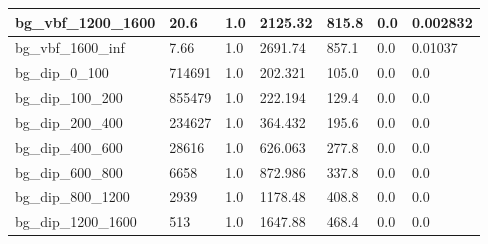 \documentclass[a4paper, 10pt]{article}
\begin{document}
\begin{table}[H]
\begin{center}
\begin{tabular}{|m{23.0mm}|m{23.0mm}|m{18.0mm}|m{19.0mm}|m{19.0mm}|m{19.0mm}|m{19.0mm}|}
      \hline
      {\cellcolor{white}         bg\_vbf\_1200\_1600}& {\cellcolor{white}         20.6}& {\cellcolor{white}         1.0}& {\cellcolor{white}         2125.32}& {\cellcolor{white}         815.8}& {\cellcolor{green}         0.0}& {\cellcolor{green}         0.002832}\\
      \hline
      {\cellcolor{white}         bg\_vbf\_1600\_inf}& {\cellcolor{white}         7.66}& {\cellcolor{white}         1.0}& {\cellcolor{white}         2691.74}& {\cellcolor{white}         857.1}& {\cellcolor{green}         0.0}& {\cellcolor{green}         0.01037}\\
      \hline
      {\cellcolor{white}         bg\_dip\_0\_100}& {\cellcolor{white}         714691}& {\cellcolor{white}         1.0}& {\cellcolor{white}         202.321}& {\cellcolor{white}         105.0}& {\cellcolor{green}         0.0}& {\cellcolor{green}         0.0}\\
      \hline
      {\cellcolor{white}         bg\_dip\_100\_200}& {\cellcolor{white}         855479}& {\cellcolor{white}         1.0}& {\cellcolor{white}         222.194}& {\cellcolor{white}         129.4}& {\cellcolor{green}         0.0}& {\cellcolor{green}         0.0}\\
      \hline
      {\cellcolor{white}         bg\_dip\_200\_400}& {\cellcolor{white}         234627}& {\cellcolor{white}         1.0}& {\cellcolor{white}         364.432}& {\cellcolor{white}         195.6}& {\cellcolor{green}         0.0}& {\cellcolor{green}         0.0}\\
      \hline
      {\cellcolor{white}         bg\_dip\_400\_600}& {\cellcolor{white}         28616}& {\cellcolor{white}         1.0}& {\cellcolor{white}         626.063}& {\cellcolor{white}         277.8}& {\cellcolor{green}         0.0}& {\cellcolor{green}         0.0}\\
      \hline
      {\cellcolor{white}         bg\_dip\_600\_800}& {\cellcolor{white}         6658}& {\cellcolor{white}         1.0}& {\cellcolor{white}         872.986}& {\cellcolor{white}         337.8}& {\cellcolor{green}         0.0}& {\cellcolor{green}         0.0}\\
      \hline
      {\cellcolor{white}         bg\_dip\_800\_1200}& {\cellcolor{white}         2939}& {\cellcolor{white}         1.0}& {\cellcolor{white}         1178.48}& {\cellcolor{white}         408.8}& {\cellcolor{green}         0.0}& {\cellcolor{green}         0.0}\\
      \hline
      {\cellcolor{white}         bg\_dip\_1200\_1600}& {\cellcolor{white}         513}& {\cellcolor{white}         1.0}& {\cellcolor{white}         1647.88}& {\cellcolor{white}         468.4}& {\cellcolor{green}         0.0}& {\cellcolor{green}         0.0}\\

\end{tabular}
\end{center}
\end{table}
\end{document}

